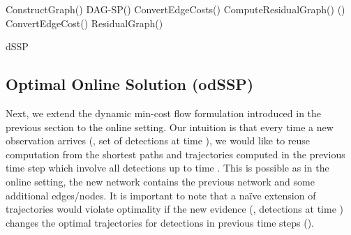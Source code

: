 \documentclass[10pt,twocolumn,letterpaper]{article}
\begin{document}
\begin{algorithm}[t]
  \DontPrintSemicolon
   ConstructGraph()\;
   DAG-SP() 
   ConvertEdgeCosts() 
   ComputeResidualGraph()\;
  \While(){} {
    \;
\;
\;
     ConvertEdgeCost()\;
     ResidualGraph()\;
  }
  \Return{}\;
  \caption{dSSP}
  \label{algo:ssp_offline_dDijkstra}
\end{algorithm} \subsection{Optimal Online Solution (odSSP)}\label{sec:online_optimal}

Next, we extend the dynamic min-cost flow formulation introduced in the previous section to the online setting.
Our intuition is that every time a new observation arrives (\ie, set of detections at time ), we would like to reuse computation from the shortest paths and trajectories computed in the previous time step which involve all detections up to time . This is possible as in the online setting, the new network contains the previous network and some additional edges/nodes. It is important to note that a na\"ive extension of trajectories would violate optimality if the new evidence (\ie, detections at time ) changes the optimal trajectories for detections in previous time steps (). 
\end{document}
